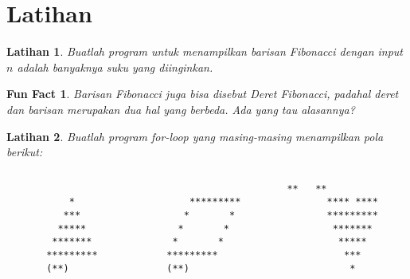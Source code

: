 \documentclass[aspectratio=169]{beamer}
\newtheorem*{funfact}{Fun Fact}
\newtheorem{latihan}{Latihan}
\theoremstyle{definition}
\begin{document}
    \section{Latihan}
    \begin{frame}
        \begin{latihan}
            Buatlah program untuk menampilkan barisan Fibonacci dengan input $n$ adalah banyaknya suku yang diinginkan.
        \end{latihan}
        \begin{funfact}
            Barisan Fibonacci juga bisa disebut Deret Fibonacci, padahal deret dan barisan merupakan dua hal yang berbeda. Ada yang tau alasannya?
        \end{funfact}
    \end{frame}
    
    \begin{frame}[fragile]
        \begin{latihan}
            Buatlah program for-loop yang masing-masing menampilkan pola berikut:
        \end{latihan}
        \begin{columns}
            \begin{column}{0.3\textwidth}
                \begin{lstlisting}[style=output]
    
           *
          ***
         *****
        *******
       *********
       (**)
                \end{lstlisting}
            \end{column}
            \begin{column}{0.3\textwidth}
                \begin{lstlisting}[style=output]
    
        *********
       *       *
      *       *
     *       *
    *********
    (**)
                \end{lstlisting}
            \end{column}
            \begin{column}{0.3\textwidth}
                \begin{lstlisting}[style=output]
        **   **
       **** ****
       *********
        *******
         *****
          ***
           *
                \end{lstlisting}
            \end{column}
        \end{columns}
    \end{frame}
\end{document}
